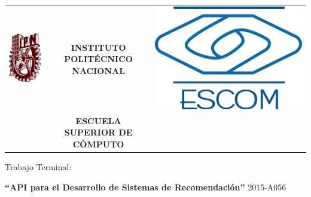 \begin{titlepage}
    \begin{center}
    \begin{tabular}{r c l}
    \includegraphics[scale=.20]{images/ipn} & \textbf{INSTITUTO POLIT\'ECNICO NACIONAL} & \includegraphics[scale=.20]{images/escom}\\ 
    & \textbf{ESCUELA SUPERIOR DE C\'OMPUTO}
    \end{tabular}
    \end{center}


    \vspace{1.5cm}
    \begin{center}
    \large Trabajo Terminal: \linebreak

    \large \textbf{``API para el Desarrollo de Sistemas de Recomendaci\'on''} \linebreak
    \large 2015-A056


\end{center}
\end{titlepage}
